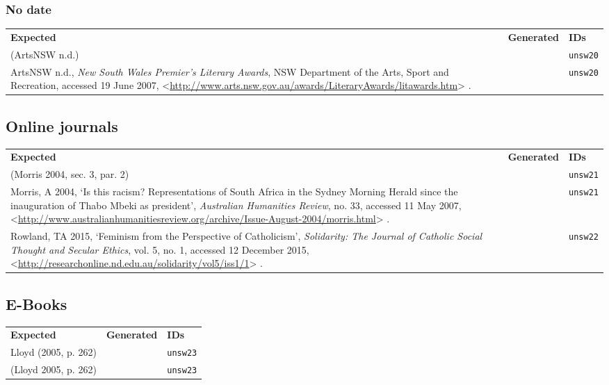 \documentclass[a4paper,landscape,12pt]{article}
\newlength\q
\newlength\qr
\newenvironment{citetable}
  {\noindent\begin{longtable}{p{\q} p{\q} p{\qr}}\textbf{Expected} & \textbf{Generated} & \textbf{IDs}\\}
  {\end{longtable}}
\newcommand{\citeurlex}[1]{%
  \let\oldurlfont\UrlFont%
  \def\UrlFont{}%
  \textless\url{#1}\textgreater%
  \let\UrlFont\oldurlfont}
\begin{document}
\subsubsection{No date}

\begin{citetable}
	(ArtsNSW n.d.) & \parencite{unsw20} & \texttt{unsw20} \\
	ArtsNSW n.d., \textit{New South Wales Premier’s Literary Awards}, NSW Department of the Arts, Sport and Recreation, accessed 19 June 2007, \citeurlex{http://www.arts.nsw.gov.au/awards/LiteraryAwards/litawards.htm}. & \fullcite{unsw20} & \texttt{unsw20} \\
\end{citetable}

\subsection{Online journals}

\begin{citetable}
	(Morris 2004, sec. 3, par. 2) & \parencite[sec.~3,~par.~2]{unsw21} & \texttt{unsw21} \\
	Morris, A 2004, `Is this racism? Representations of South Africa in the Sydney Morning Herald since the inauguration of Thabo Mbeki as president', \textit{Australian Humanities Review}, no. 33, accessed 11 May 2007, \citeurlex{http://www.australianhumanitiesreview.org/archive/Issue-August-2004/morris.html}. & \fullcite{unsw21} & \texttt{unsw21} \\
	Rowland, TA 2015, `Feminism from the Perspective of Catholicism', \textit{Solidarity: The Journal of Catholic Social Thought and Secular Ethics}, vol. 5, no. 1, accessed 12 December 2015, \citeurlex{http://researchonline.nd.edu.au/solidarity/vol5/iss1/1}. & \fullcite{unsw22} & \texttt{unsw22} \\
\end{citetable}

\subsection{E-Books}

\begin{citetable}
	Lloyd (2005, p. 262) & \textcite[p.~262]{unsw23} & \texttt{unsw23} \\
	(Lloyd 2005, p. 262) & \parencite[p.~262]{unsw23} & \texttt{unsw23} \\
\end{citetable}
\end{document}
